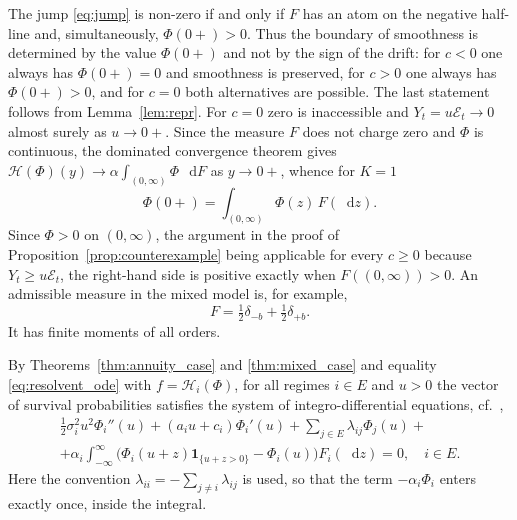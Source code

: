 \documentclass[smallextended]{svjour3}
\newcommand{\Ind}{\mathbf{1}}
\newcommand{\diff}{\mathop{}\!\mathrm{d}}
\begin{document}
\begin{remark}
The jump \eqref{eq:jump} is non-zero if and only if $F$ has an atom on the
negative half-line and, simultaneously, $\Phi(0+)>0$. Thus the boundary of
smoothness is determined by the value $\Phi(0+)$ and not by the sign of the
drift: for $c<0$ one always has $\Phi(0+)=0$ and smoothness is preserved, for
$c>0$ one always has $\Phi(0+)>0$, and for $c=0$ both alternatives are
possible. The last statement follows from Lemma~\ref{lem:repr}. For $c=0$ zero
is inaccessible and $Y_t=u\mathcal E_t\to0$ almost surely as $u\to0+$. Since
the measure $F$ does not charge zero and $\Phi$ is continuous, the dominated
convergence theorem gives
$\mathcal H(\Phi)(y)\to\alpha\int_{(0,\infty)}\Phi\,\diff F$ as $y\to0+$,
whence for $K=1$
$$
\Phi(0+)=\int_{(0,\infty)}\Phi(z)\,F(\diff z) .
$$
Since $\Phi>0$ on $(0,\infty)$, the argument in the proof of
Proposition~\ref{prop:counterexample} being applicable for every $c\ge0$
because $Y_t\ge u\mathcal E_t$, the right-hand side is positive exactly when
$F((0,\infty))>0$. An admissible measure in the mixed model is, for example,
$$
F=\tfrac12\delta_{-b}+\tfrac12\delta_{+b} .
$$
It has finite moments of all orders.
\end{remark}

By Theorems~\ref{thm:annuity_case} and \ref{thm:mixed_case} and equality
\eqref{eq:resolvent_ode} with $f=\mathcal H_i(\Phi)$, for all regimes $i\in E$
and $u>0$ the vector of survival probabilities satisfies the system of
integro-differential equations, cf.\ \cite[Proposition~2]{AntipovKabanov},
\begin{multline*}
    \tfrac12\sigma_i^2u^2\Phi_i''(u)+(a_iu+c_i)\Phi_i'(u)
    +\sum_{j\in E}\lambda_{ij}\Phi_j(u)+ \\
    +\alpha_i\int_{-\infty}^{\infty}
    \bigl(\Phi_i(u+z)\Ind_{\{u+z>0\}}-\Phi_i(u)\bigr)F_i(\diff z)=0,
    \quad i\in E.
\end{multline*}
Here the convention $\lambda_{ii}=-\sum_{j\ne i}\lambda_{ij}$ is used, so that
the term $-\alpha_i\Phi_i$ enters exactly once, inside the integral.
\end{document}
